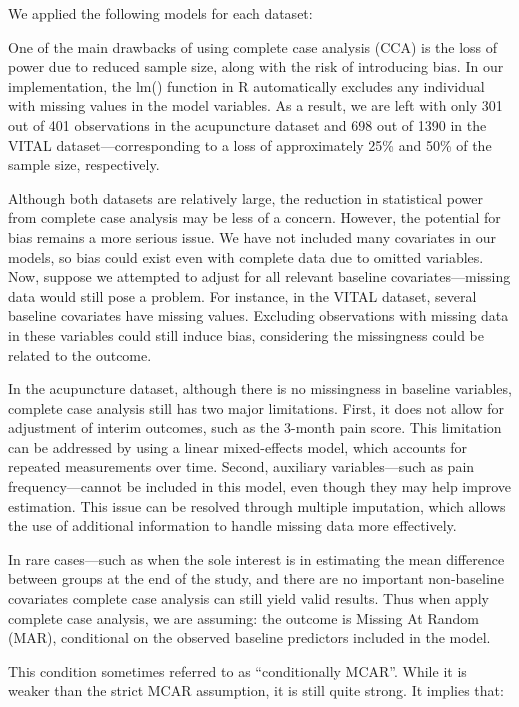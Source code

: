 \documentclass{article}
\begin{document}
We applied the following models for each dataset:

One of the main drawbacks of using complete case analysis (CCA) is the
loss of power due to reduced sample size, along with the risk of
introducing bias. In our implementation, the lm() function in R
automatically excludes any individual with missing values in the model
variables. As a result, we are left with only 301 out of 401
observations in the acupuncture dataset and 698 out of 1390 in the VITAL
dataset---corresponding to a loss of approximately 25\% and 50\% of the
sample size, respectively.

Although both datasets are relatively large, the reduction in
statistical power from complete case analysis may be less of a concern.
However, the potential for bias remains a more serious issue. We have
not included many covariates in our models, so bias could exist even
with complete data due to omitted variables. Now, suppose we attempted
to adjust for all relevant baseline covariates---missing data would
still pose a problem. For instance, in the VITAL dataset, several
baseline covariates have missing values. Excluding observations with
missing data in these variables could still induce bias, considering the
missingness could be related to the outcome.

In the acupuncture dataset, although there is no missingness in baseline
variables, complete case analysis still has two major limitations.
First, it does not allow for adjustment of interim outcomes, such as the
3-month pain score. This limitation can be addressed by using a linear
mixed-effects model, which accounts for repeated measurements over time.
Second, auxiliary variables---such as pain frequency---cannot be
included in this model, even though they may help improve estimation.
This issue can be resolved through multiple imputation, which allows the
use of additional information to handle missing data more effectively.

In rare cases---such as when the sole interest is in estimating the mean
difference between groups at the end of the study, and there are no
important non-baseline covariates complete case analysis can still yield
valid results. Thus when apply complete case analysis, we are assuming:
the outcome is Missing At Random (MAR), conditional on the observed
baseline predictors included in the model.

This condition sometimes referred to as ``conditionally MCAR''. While it
is weaker than the strict MCAR assumption, it is still quite strong. It
implies that:
\end{document}
